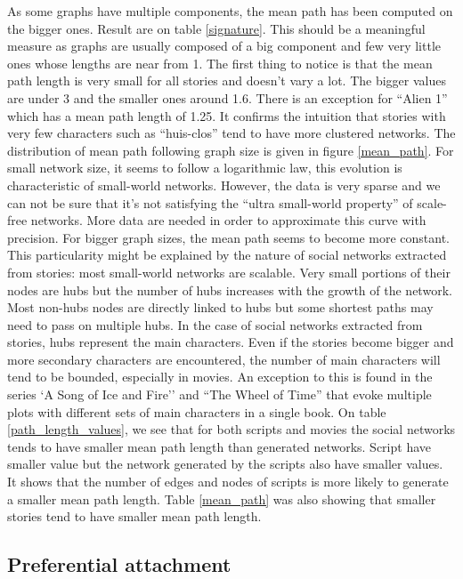 \documentclass[a4paper, 12pt]{report}
\begin{document}
As some graphs have multiple components, the mean path has been computed on the bigger ones. Result are on table \ref{signature}. This should be a meaningful measure as graphs are usually composed of a big component and few very little ones whose lengths are near from 1. The first thing to notice is that the mean path length is very small for all stories and doesn't vary a lot. The bigger values are under 3 and the smaller ones around 1.6. There is an exception for ``Alien 1'' which has a mean path length of 1.25. It confirms the intuition that stories with very few characters such as ``huis-clos'' tend to have more clustered networks.
The distribution of mean path following graph size is given in figure \ref{mean_path}.
For small network size, it seems to follow a logarithmic law, this evolution is characteristic of small-world networks. However, the data is very sparse and we can not be sure that it's not satisfying the ``ultra small-world property'' of scale-free networks. More data are needed in order to approximate this curve with precision.
For bigger graph sizes, the mean path seems to become more constant. This particularity might be explained by the nature of social networks extracted from stories: most small-world networks are scalable.
Very small portions of their nodes are hubs but the number of hubs increases with the growth of the network. Most non-hubs nodes are directly linked to hubs but some shortest paths may need to pass on multiple hubs.
In the case of social networks extracted from stories, hubs represent the main characters.
Even if the stories become bigger and more secondary characters are encountered, the number of main characters will tend to be bounded, especially in movies.
An exception to this is found in the series `A Song of Ice and Fire'' and ``The Wheel of Time'' that evoke multiple plots with different sets of main characters in a single book.
On table \ref{path_length_values}, we see that for both scripts and movies the social networks tends to have smaller mean path length than generated networks. Script have smaller value but the network generated by the scripts also have smaller values. It shows that the number of edges and nodes of scripts is more likely to generate a smaller mean path length. Table \ref{mean_path} was also showing that smaller stories tend to have smaller mean path length.

\subsection{Preferential attachment}
\end{document}
